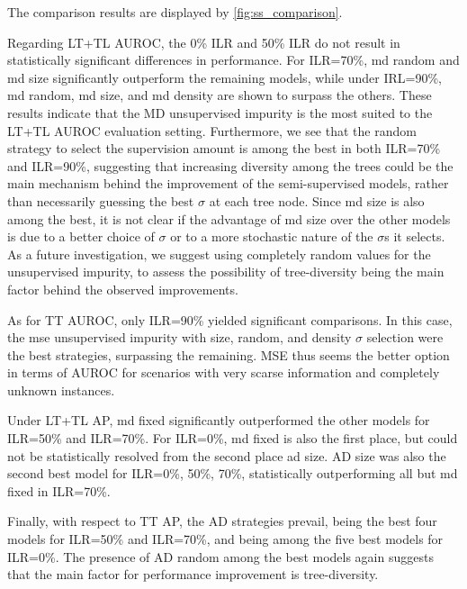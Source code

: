 The comparison results are displayed by \autoref{fig:ss_comparison}.

Regarding LT+TL AUROC, the 0\% ILR and 50\% ILR do not result in statistically significant differences in performance. For ILR=70\%, md random and md size significantly outperform the remaining models, while under IRL=90\%, md random, md size, and md density are shown to surpass the others. These results indicate that the MD unsupervised impurity is the most suited to the LT+TL AUROC evaluation setting. Furthermore, we see that the random strategy to select the supervision amount %
is among the best in both ILR=70\% and ILR=90\%, suggesting that increasing diversity among the trees could be the main mechanism behind the improvement of the semi-supervised models, rather than necessarily guessing the best $\sigma$ at each tree node. Since md size is also among the best, it is not clear if the advantage of md size over the other models is due to a better choice of $\sigma$ or to a more stochastic nature of the $\sigma$s it selects.
%
%
As a future investigation, we suggest using completely random values for the unsupervised impurity, to assess the possibility of tree-diversity being the main factor behind the observed improvements.

As for TT AUROC, only ILR=90\% yielded significant comparisons. In this case, the mse unsupervised impurity with size, random, and density $\sigma$ selection were the best strategies, surpassing the remaining. MSE thus seems the better option in terms of AUROC for scenarios with very scarse information and completely unknown instances.

Under LT+TL AP, md fixed significantly outperformed the other models for ILR=50\% and ILR=70\%. For ILR=0\%, md fixed is also the first place, but could not be statistically resolved from the second place ad size. AD size was also the second best model for ILR=0\%, 50\%, 70\%, statistically outperforming all but md fixed in ILR=70\%.

Finally, with respect to TT AP, the AD strategies prevail, being the best four models for ILR=50\% and ILR=70\%, and being among the five best models for ILR=0\%. The presence of AD random among the best models again suggests that the main factor for performance improvement is tree-diversity.



